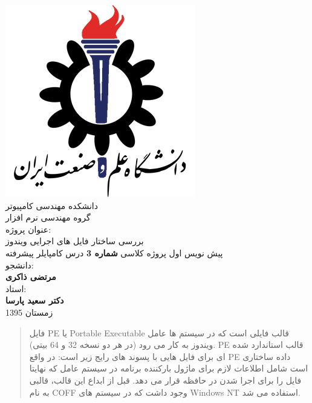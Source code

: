 \documentclass{report}
\begin{document}
	\begin{titlepage}
		\begin{center}
			\includegraphics[scale=0.35]{./imgs/IUST_logo_color.png}
			\baselineskip=1.2cm
			\\
			دانشکده مهندسی کامپیوتر
			\\
			گروه مهندسی نرم افزار
			\\
			{\large عنوان پروژه:}
			\\
			{\huge{} بررسی ساختار فایل های اجرایی ویندوز}
			\\ 
			پیش نویس اول پروژه کلاسی 
			\textbf{شماره 3 }
			درس کامپایلر پیشرفته 
			\\
			
		{\large 	دانشجو:}
			\\
{\large \textbf{مرتضی ذاکری} }
			\\
			
			استاد:
			\\
		{\large \textbf{دکتر سعید پارسا} }
			\\
			
			زمستان 1395
		
		\end{center}
	\end{titlepage}

\begin{abstract}
	فایل PE یا Portable Executable قالب فایلی است که در سیستم ها عامل ویندوز به کار می رود (در هر دو نسخه 32 و 64 بیتی). PE قالب استاندارد شده ای برای فایل هایی با پسوند های رایج زیر است:
	در واقع PE داده ساختاری است شامل اطلاعات لازم برای ماژول بارکننده برنامه در سیستم عامل که نهایتا فایل را برای اجرا شدن در حافظه قرار می دهد. قبل از ابداع این قالب، قالبی به نام COFF وجود داشت که در سیستم های Windows NT استفاده می شد.
	
\end{abstract}
\newpage
\tableofcontents
\newpage
	
\end{document}
